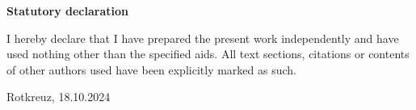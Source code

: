 \setlength{\parindent}{0pt}

\textbf{Statutory declaration} \par

I hereby declare that I have prepared the present work independently and have used nothing other than the specified aids. All text sections, citations or contents of other authors used have been explicitly marked as such. \par 
\vspace*{10.5pt} 
Rotkreuz, 18.10.2024 \underline{\hspace*{4cm}} \par 

\newpage
